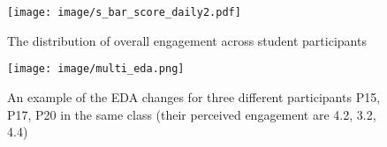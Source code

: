 \documentclass[sigconf]{acmart}
\begin{document}
\begin{figure}
    \centering
    \texttt{[image: image/s\_bar\_score\_daily2.pdf]}
    \caption{The distribution of overall engagement across student participants}
    \label{fig:dis_engage}
\end{figure}





\begin{figure}
    \centering
    \texttt{[image: image/multi\_eda.png]}
    \caption{An example of the EDA changes for three different participants P15, P17, P20 in the same class (their perceived engagement are 4.2, 3.2, 4.4)}
    \label{fig:multi_eda}
\end{figure}

\begin{comment}
\begin{figure*}
    \centering
    \texttt{[image: image/course\_anno.pdf]}
    \caption{The impact of course subjects on the perceived self-report engagement}
    \label{fig:impact_subject_anno}
\end{figure*}
\begin{figure*}
    \centering
    \texttt{[image: image/course\_e4.pdf]}
    \caption{The impact of course subjects on the physiological-measured engagement}
    \label{fig:impact_subject}
\end{figure*}

\end{comment}


\end{document}
